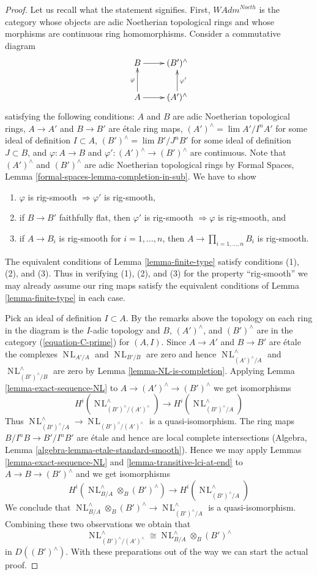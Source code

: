 \documentclass{stacks-project}
\theoremstyle{plain}
\theoremstyle{definition}
\theoremstyle{remark}
\numberwithin{equation}{subsection}
\def\lim{\mathop{\mathrm{lim}}\nolimits}
\def\NL{\mathop{N\!L}\nolimits}
\begin{document}
\begin{proof}
Let us recall what the statement signifies. First, 
$\textit{WAdm}^{Noeth}$ is the category whose objects are
adic Noetherian topological rings and whose morphisms are
continuous ring homomorphisms. Consider a commutative diagram
$$
\xymatrix{
B \ar[r] & (B')^\wedge \\
A \ar[r] \ar[u]^\varphi & (A')^\wedge \ar[u]_{\varphi'}
}
$$
satisfying the following conditions:
$A$ and $B$ are adic Noetherian topological rings,
$A \to A'$ and $B \to B'$ are \'etale ring maps,
$(A')^\wedge = \lim A'/I^nA'$ for some ideal of definition $I \subset A$,
$(B')^\wedge = \lim B'/J^nB'$ for some ideal of definition $J \subset B$, and
$\varphi : A \to B$ and $\varphi' : (A')^\wedge \to (B')^\wedge$
are continuous. Note that $(A')^\wedge$ and $(B')^\wedge$ are
adic Noetherian topological rings by
Formal Spaces, Lemma \ref{formal-spaces-lemma-completion-in-sub}.
We have to show
\begin{enumerate}
\item $\varphi$ is rig-smooth $\Rightarrow \varphi'$ is rig-smooth,
\item if $B \to B'$ faithfully flat, then $\varphi'$ is rig-smooth
$\Rightarrow \varphi$ is rig-smooth, and
\item if $A \to B_i$ is rig-smooth for $i = 1, \ldots, n$, then
$A \to \prod_{i = 1, \ldots, n} B_i$ is rig-smooth.
\end{enumerate}
The equivalent conditions of Lemma \ref{lemma-finite-type} satisfy
conditions (1), (2), and (3).
Thus in verifying (1), (2), and (3) for the property
``rig-smooth'' we may already assume our ring maps satisfy
the equivalent conditions of Lemma \ref{lemma-finite-type}
in each case.

\medskip\noindent
Pick an ideal of definition $I \subset A$. By the remarks above
the topology on each ring in the diagram is the $I$-adic topology
and $B$, $(A')^\wedge$, and $(B')^\wedge$ are in the category
(\ref{equation-C-prime}) for $(A, I)$.
Since $A \to A'$ and $B \to B'$ are \'etale the complexes
$\NL_{A'/A}$ and $\NL_{B'/B}$ are zero and hence
$\NL_{(A')^\wedge/A}^\wedge$ and $\NL_{(B')^\wedge/B}^\wedge$
are zero by Lemma \ref{lemma-NL-is-completion}.
Applying Lemma \ref{lemma-exact-sequence-NL} to
$A \to (A')^\wedge \to (B')^\wedge$ we get isomorphisms
$$
H^i(\NL_{(B')^\wedge/(A')^\wedge}^\wedge) \to H^i(\NL_{(B')^\wedge/A}^\wedge)
$$
Thus $\NL_{(B')^\wedge/A}^\wedge \to \NL_{(B')^\wedge/(A')^\wedge}$
is a quasi-isomorphism. The ring maps $B/I^nB \to B'/I^nB'$ are \'etale
and hence are local complete intersections
(Algebra, Lemma \ref{algebra-lemma-etale-standard-smooth}).
Hence we may apply
Lemmas \ref{lemma-exact-sequence-NL} and
\ref{lemma-transitive-lci-at-end} to
$A \to B \to (B')^\wedge$ and we get isomorphisms
$$
H^i(\NL_{B/A}^\wedge \otimes_B (B')^\wedge) \to
H^i(\NL_{(B')^\wedge/A}^\wedge)
$$
We conclude that
$\NL_{B/A}^\wedge \otimes_B (B')^\wedge \to \NL_{(B')^\wedge/A}^\wedge$
is a quasi-isomorphism. Combining these two observations we obtain that
$$
\NL_{(B')^\wedge/(A')^\wedge}^\wedge \cong
\NL_{B/A}^\wedge \otimes_B (B')^\wedge
$$
in $D((B')^\wedge)$.
With these preparations out of the way we can start the actual proof.


\end{proof}
\end{document}
